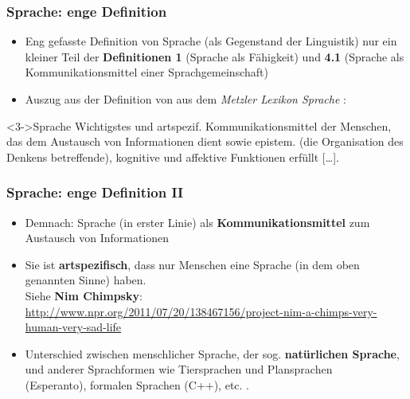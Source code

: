 
\begin{frame}
\frametitle{Sprache: enge Definition}

\begin{itemize}
	\item<1-> Eng gefasste Definition von Sprache (als Gegenstand der Linguistik) \ras nur ein kleiner Teil der \textbf{Definitionen 1} (Sprache als Fähigkeit) und \textbf{4.1} (Sprache als Kommunikationsmittel einer Sprachgemeinschaft)
	\item<2-> Auszug aus der Definition von  aus dem \textit{Metzler Lexikon Sprache} \citep{Glueck&Roedel16a}:
\end{itemize}
			
\begin{block}<3->{Sprache}
    	   Wichtigstes und artspezif. Kommunikationsmittel der Menschen, das dem Austausch von Informationen dient sowie epistem. (die Organisation des Denkens betreffende), kognitive und affektive Funktionen erfüllt {[}\ldots].
\end{block}
	
\end{frame}


\begin{frame}
\frametitle{Sprache: enge Definition II}

\begin{itemize}
	\item<1-> Demnach: Sprache (in erster Linie) als \textbf{Kommunikationsmittel} zum Austausch von Informationen
	\item<2-> Sie ist \textbf{artspezifisch}, \dash dass nur Menschen eine Sprache (in dem
          oben genannten Sinne) haben.\\
	Siehe \textbf{Nim Chimpsky}:\\
	\url{http://www.npr.org/2011/07/20/138467156/project-nim-a-chimps-very-human-very-sad-life}
	\item<3-> Unterschied zwischen menschlicher Sprache, \dash der sog. \textbf{natürlichen
          Sprache}, und anderer Sprachformen wie Tiersprachen und Plansprachen\\
 (\zb Esperanto), formalen Sprachen (\zb C++), etc. \citep[vgl.][]{Thuemmel00a}.\
\end{itemize}		

\nocite{Bussmann83a-removed}
\end{frame}


